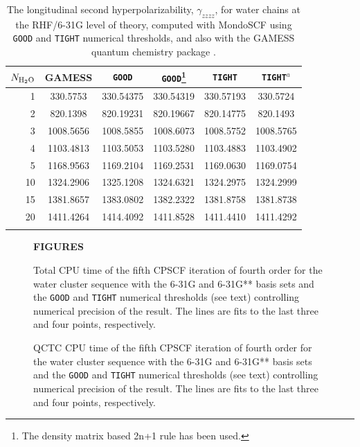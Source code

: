 \documentclass[prl,aps,preprint,showpacs,superbib]{revtex4}
\begin{document}
{\begin{table}[h]
  \centering
  \caption{\protect
    The longitudinal second hyperpolarizability, $\gamma_{zzzz}$,
    for water chains at the RHF/6-31G level of theory, computed with 
    {\sc MondoSCF} using {\tt GOOD} and {\tt TIGHT} numerical thresholds, 
    and also with the {\sc GAMESS} quantum chemistry package \cite{gamess}.
  }\label{tab:Gamma_1D_Values}
  \begin{tabular}{rccccc}
    \toprule
    $N_{\rm H_2 O}$ &\multicolumn{1}{c}{{\sc GAMESS}}
    &\multicolumn{1}{c}{{\tt GOOD}}
    &\multicolumn{1}{c}{{\tt GOOD}\footnote[1]{The density matrix based 2n+1 rule has been used.}}
    &\multicolumn{1}{c}{{\tt TIGHT}}
    &\multicolumn{1}{c}{{\tt TIGHT}$^a$} \\
    \hline
     1 &  330.5753 & 330.54375 & 330.54319 & 330.57193 &  330.5724 \\
     2 &  820.1398 & 820.19231 & 820.19667 & 820.14775 &  820.1493 \\
     3 & 1008.5656 & 1008.5855 & 1008.6073 & 1008.5752 & 1008.5765 \\
     4 & 1103.4813 & 1103.5053 & 1103.5280 & 1103.4883 & 1103.4902 \\
     5 & 1168.9563 & 1169.2104 & 1169.2531 & 1169.0630 & 1169.0754 \\
    10 & 1324.2906 & 1325.1208 & 1324.6321 & 1324.2975 & 1324.2999 \\
    15 & 1381.8657 & 1383.0802 & 1382.2322 & 1381.8758 & 1381.8738 \\
    20 & 1411.4264 & 1414.4092 & 1411.8528 & 1411.4410 & 1411.4292 \\
    \botrule
  \end{tabular}
\end{table}

\clearpage

\begin{figure}[h]
\begin{center}
\bf  FIGURES\\[1.cm]
\end{center}

  \caption{\protect
    Total CPU time of the fifth CPSCF iteration of fourth order for
    the water cluster sequence with the 6-31G and 6-31G** 
    basis sets and the {\tt GOOD} and {\tt TIGHT} 
    numerical thresholds (see text) controlling numerical
    precision of the result. The lines are fits to the 
    last three and four points, respectively.
  }\label{fig:Gamma_scaling}

  \caption{\protect
    QCTC CPU time of the fifth CPSCF iteration of fourth order for
    the water cluster sequence with the 6-31G and 6-31G** 
    basis sets and the {\tt GOOD} and {\tt TIGHT} 
    numerical thresholds (see text) controlling numerical
    precision of the result. The lines are fits to the 
    last three and four points, respectively.
  }\label{fig:Gamma_QCTC_Timing}


\end{figure}}
\end{document}
